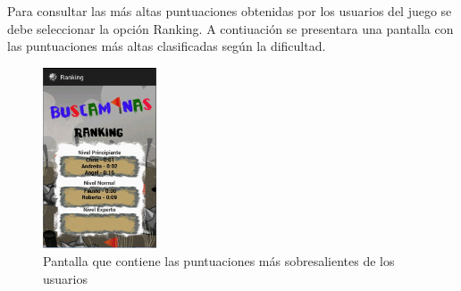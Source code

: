 \documentclass[11pt]{article} %
\begin{document}
\newpage
\thispagestyle{empty}

Para consultar las m\'as altas puntuaciones obtenidas por los usuarios del juego se debe seleccionar la opci\'on Ranking. A contiuaci\'on se presentara una pantalla con las puntuaciones m\'as altas clasificadas seg\'un la dificultad.
\begin{center}

	\begin{figure}[h!]
  		\centering
    		\includegraphics[width=0.3\textwidth]{imagenes/Ranking.JPG}
  		\caption{Pantalla que contiene las puntuaciones  m\'as sobresalientes de los usuarios}
		\label{fig:ranking}
	\end{figure}
\end{center}

\newpage
\thispagestyle{empty}
\end{document}
